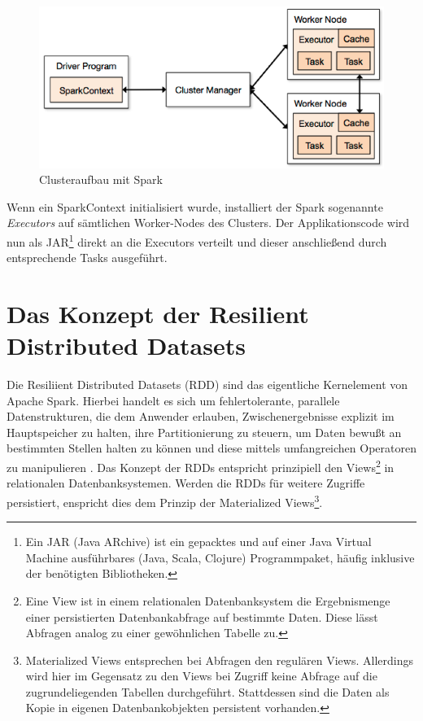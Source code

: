 

\begin{figure}[htb!]
\centering
\includegraphics[width=1.0\textwidth]{bilder/3_2_cluster.png}
\caption{Clusteraufbau mit Spark \protect{}}
\label{fig:sparkcluster}
\end{figure} 





Wenn ein SparkContext initialisiert wurde, installiert der Spark sogenannte \textit{Executors} auf sämtlichen Worker-Nodes des Clusters. Der Applikationscode wird nun als JAR\footnote{Ein JAR (Java ARchive) ist ein gepacktes und auf einer Java Virtual Machine ausführbares (Java, Scala, Clojure) Programmpaket, häufig inklusive der benötigten Bibliotheken.} direkt an die Executors verteilt und dieser anschließend durch entsprechende Tasks ausgeführt. 



  
\section{Das Konzept der Resilient Distributed Datasets}
\label{section:rdd}

Die Resiliient Distributed Datasets (RDD) sind das eigentliche Kernelement von Apache Spark. Hierbei handelt es sich um fehlertolerante, parallele Datenstrukturen, die dem Anwender erlauben, Zwischenergebnisse explizit im Hauptspeicher zu halten, ihre Partitionierung zu steuern, um Daten bewußt an bestimmten Stellen halten zu können und diese mittels umfangreichen Operatoren zu manipulieren  . Das Konzept der RDDs entspricht prinzipiell den Views\footnote{Eine View ist in einem relationalen Datenbanksystem die Ergebnismenge einer persistierten Datenbankabfrage auf bestimmte Daten. Diese lässt Abfragen analog zu einer gewöhnlichen Tabelle zu.} in relationalen Datenbanksystemen. Werden die RDDs für weitere Zugriffe persistiert, enspricht dies dem Prinzip der Materialized Views\footnote{Materialized Views entsprechen bei Abfragen den regulären Views. Allerdings wird hier im Gegensatz zu den Views bei Zugriff keine Abfrage auf die zugrundeliegenden Tabellen durchgeführt. Stattdessen sind die Daten als Kopie in eigenen Datenbankobjekten persistent vorhanden.}.  

